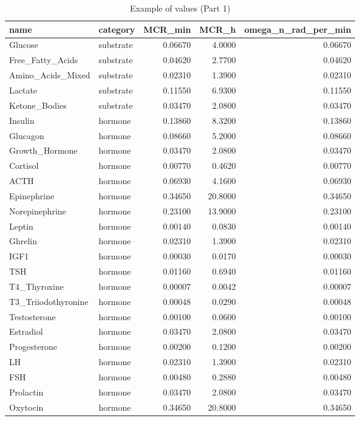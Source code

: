\documentclass[
]{book}
\begin{document}
\begin{longtable}[t]{llrrr}
\caption{\label{tab:table-1}Example of values (Part 1)}\\
\toprule
name & category & MCR\_min & MCR\_h & omega\_n\_rad\_per\_min\\
\midrule
Glucose & substrate & 0.06670 & 4.0000 & 0.06670\\
Free\_Fatty\_Acids & substrate & 0.04620 & 2.7700 & 0.04620\\
Amino\_Acids\_Mixed & substrate & 0.02310 & 1.3900 & 0.02310\\
Lactate & substrate & 0.11550 & 6.9300 & 0.11550\\
Ketone\_Bodies & substrate & 0.03470 & 2.0800 & 0.03470\\
\addlinespace
Insulin & hormone & 0.13860 & 8.3200 & 0.13860\\
Glucagon & hormone & 0.08660 & 5.2000 & 0.08660\\
Growth\_Hormone & hormone & 0.03470 & 2.0800 & 0.03470\\
Cortisol & hormone & 0.00770 & 0.4620 & 0.00770\\
ACTH & hormone & 0.06930 & 4.1600 & 0.06930\\
\addlinespace
Epinephrine & hormone & 0.34650 & 20.8000 & 0.34650\\
Norepinephrine & hormone & 0.23100 & 13.9000 & 0.23100\\
Leptin & hormone & 0.00140 & 0.0830 & 0.00140\\
Ghrelin & hormone & 0.02310 & 1.3900 & 0.02310\\
IGF1 & hormone & 0.00030 & 0.0170 & 0.00030\\
\addlinespace
TSH & hormone & 0.01160 & 0.6940 & 0.01160\\
T4\_Thyroxine & hormone & 0.00007 & 0.0042 & 0.00007\\
T3\_Triiodothyronine & hormone & 0.00048 & 0.0290 & 0.00048\\
Testosterone & hormone & 0.00100 & 0.0600 & 0.00100\\
Estradiol & hormone & 0.03470 & 2.0800 & 0.03470\\
\addlinespace
Progesterone & hormone & 0.00200 & 0.1200 & 0.00200\\
LH & hormone & 0.02310 & 1.3900 & 0.02310\\
FSH & hormone & 0.00480 & 0.2880 & 0.00480\\
Prolactin & hormone & 0.03470 & 2.0800 & 0.03470\\
Oxytocin & hormone & 0.34650 & 20.8000 & 0.34650\\

\end{longtable}
\end{document}
